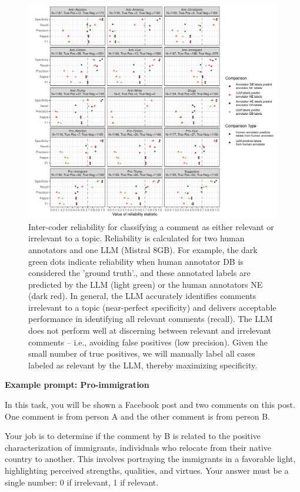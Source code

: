 \documentclass{article}
\begin{document}
\begin{figure}
    \centering
    \includegraphics[width=1.3\linewidth]{figures/classifier_performance.pdf}
    \caption{Inter-coder reliability for classifying a comment as either relevant or irrelevant to a topic. Reliability is calculated for two human annotators and one LLM (Mistral 8GB). For example, the dark green dots indicate reliability when human annotator DB is considered the 'ground truth'., and these annotated labels are predicted by the LLM (light green) or the human annotators NE (dark red). In general, the LLM accurately identifies comments irrelevant to a topic (near-perfect specificity) and delivers acceptable performance in identifying all relevant comments (recall). The LLM does not perform well at discerning between relevant and irrelevant comments -- i.e., avoiding false positives (low precision). Given the small number of true positives, we will manually label all cases labeled as relevant by the LLM, thereby maximizing specificity.}
    \label{fig:intercoder-reliability}
\end{figure}
\clearpage

%

\textbf{Example prompt: Pro-immigration}

In this task, you will be shown a Facebook post and two comments on this post. One comment is from person A and the other comment is from person B. 

Your job is to determine if the comment by B is related to the positive characterization of immigrants, individuals who relocate from their native country to another. This involves portraying the immigrants in a favorable light, highlighting perceived strengths, qualities, and virtues.
Your answer must be a single number: 0 if irrelevant, 1 if relevant.
\end{document}
